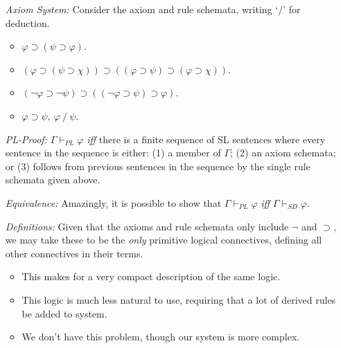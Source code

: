 \documentclass[a4paper, 11pt]{article} %
\begin{document}
\begin{enumerate}
  \item[\it Axiom System:] Consider the axiom and rule schemata, writing `$/$' for deduction.
    \begin{itemize}
      \item $\varphi \supset (\psi \supset \varphi)$.
      \item $(\varphi \supset (\psi \supset \chi)) \supset ((\varphi \supset \psi) \supset (\varphi \supset \chi))$.
      \item $(\neg\varphi \supset \neg\psi) \supset ((\neg\varphi \supset \psi) \supset \varphi)$.
      \item $\varphi \supset \psi,\ \varphi\ /\ \psi$.
    \end{itemize}
  \item[\it PL-Proof:] $\Gamma \vdash_{PL} \varphi$ \textit{iff} there is a finite sequence of SL sentences where every sentence in the sequence is either: (1) a member of $\Gamma$; (2) an axiom schemata; or (3) follows from previous sentences in the sequence by the single rule schemata given above.
  \item[\it Equivalence:] Amazingly, it is possible to show that $\Gamma \vdash_{PL} \varphi$ \textit{iff} $\Gamma \vdash_{SD} \varphi$. 
  \item[\it Definitions:] Given that the axioms and rule schemata only include $\neg$ and $\supset$, we may take these to be the \textit{only} primitive logical connectives, defining all other connectives in their terms. 
    \begin{itemize}
      \item This makes for a very compact description of the same logic.
      \item This logic is much less natural to use, requiring that a lot of derived rules be added to system.
      \item We don't have this problem, though our system is more complex.
    \end{itemize}   
\end{enumerate}

%
\end{document}
